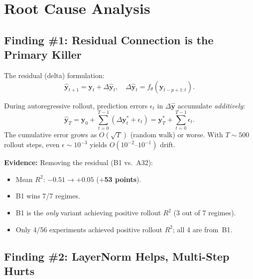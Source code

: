 \documentclass[11pt]{article}
\newcommand{\Rtwo}{R^2}
\newcommand{\good}[1]{\textcolor{goodgreen}{\textbf{#1}}}
\begin{document}
\section{Root Cause Analysis}
\label{sec:rootcause}

\subsection{Finding \#1: Residual Connection is the Primary Killer}

The residual (delta) formulation:
\begin{equation}
  \hat{\mathbf{y}}_{t+1} = \mathbf{y}_t + \Delta\hat{\mathbf{y}}_t,
  \quad
  \Delta\hat{\mathbf{y}}_t = f_\theta(\mathbf{y}_{t-p+1:t}).
\end{equation}

During autoregressive rollout, prediction errors $\epsilon_t$ in
$\Delta\hat{\mathbf{y}}$ accumulate \emph{additively}:
\begin{equation}
  \hat{\mathbf{y}}_T = \mathbf{y}_0 + \sum_{t=0}^{T-1}(\Delta\mathbf{y}_t^* + \epsilon_t)
  = \mathbf{y}_T^* + \sum_{t=0}^{T-1}\epsilon_t.
\end{equation}
The cumulative error grows as $O(\sqrt{T})$ (random walk) or worse.
With $T \sim 500$ rollout steps, even $\epsilon \sim 10^{-3}$ yields
$O(10^{-2}\text{--}10^{-1})$ drift.

\textbf{Evidence:} Removing the residual (B1 vs.\ A32):
\begin{itemize}[nosep]
  \item Mean $\Rtwo$: $-0.51 \to +0.05$ (\good{$+$53 points}).
  \item B1 wins 7/7 regimes.
  \item B1 is the \emph{only} variant achieving positive rollout $\Rtwo$
    (3 out of 7 regimes).
  \item Only 4/56 experiments achieved positive rollout $\Rtwo$;
    all 4 are from~B1.
\end{itemize}


\subsection{Finding \#2: LayerNorm Helps, Multi-Step Hurts}
\end{document}
